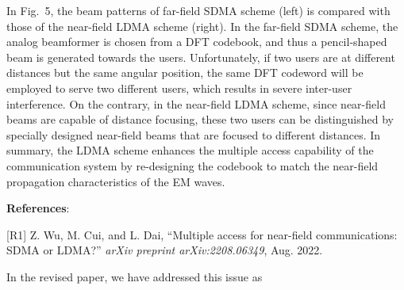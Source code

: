 \documentclass[a4paper,12pt]{article}
\begin{document}
{{\quad In Fig.~5, the beam patterns of far-field SDMA scheme (left) is compared with those of the near-field LDMA scheme (right). In the far-field SDMA scheme, the analog beamformer is chosen from a DFT codebook, and thus a pencil-shaped beam is generated towards the users. Unfortunately, if two users are at different distances but the same angular position, the same DFT codeword will be employed to serve two different users, which results in severe inter-user interference. 
On the contrary, in the near-field LDMA scheme, since near-field beams are capable of distance focusing, these two users can be distinguished by specially designed near-field beams that are focused to different distances. In summary, the LDMA scheme enhances the multiple access capability of the communication system by re-designing the codebook to match the near-field propagation characteristics of the EM waves. 



{\bf References}:

[R1] Z. Wu, M. Cui, and L. Dai, ``Multiple access for near-field communications: SDMA or LDMA?'' {\it arXiv preprint arXiv:2208.06349}, Aug. 2022. 

\quad In the revised paper, we have addressed this issue as 


}}
\end{document}
